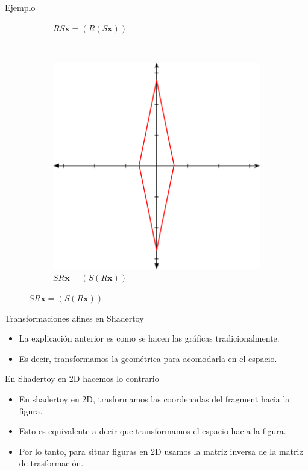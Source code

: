 \begin{frame}{Ejemplo}
\begin{figure}[htp]
\begin{subfigure}[b]{0.25\textwidth}
   \caption{$R S \mathbf{x} = ( R ( S \mathbf{x}))$}
 \end{subfigure}
 ~
 \begin{subfigure}[b]{0.25\textwidth}
   \includegraphics[width=\textwidth]{img/RoateScale}
   \caption{$S R \mathbf{x} = (S (R \mathbf{x}))$}
 \end{subfigure}
\end{figure}
\end{frame}

\begin{frame}{Transformaciones afines en Shadertoy}
\begin{itemize}
    \item La explicación anterior es como se hacen las gráficas tradicionalmente.
    \item Es decir, transformamos la geométrica para acomodarla en el espacio.
\end{itemize}
\begin{alertblock}{En Shadertoy en 2D hacemos lo contrario}
    \begin{itemize}
        \item En shadertoy en 2D, trasformamos las coordenadas del fragment hacia la figura.
        \item Esto es equivalente a decir que transformamos el espacio hacia la figura.
        \item Por lo tanto, para situar figuras en 2D usamos la matriz inversa de la matriz de trasformación.
    \end{itemize}
\end{alertblock}
\end{frame}


